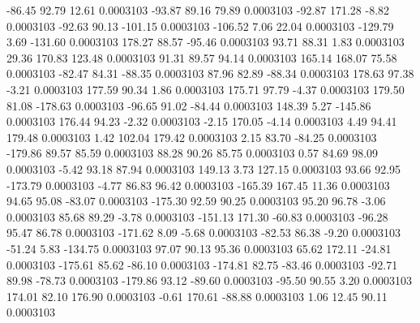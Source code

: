       -86.45       92.79       12.61     0.0003103
      -93.87       89.16       79.89     0.0003103
      -92.87      171.28       -8.82     0.0003103
      -92.63       90.13     -101.15     0.0003103
     -106.52        7.06       22.04     0.0003103
     -129.79        3.69     -131.60     0.0003103
      178.27       88.57      -95.46     0.0003103
       93.71       88.31        1.83     0.0003103
       29.36      170.83      123.48     0.0003103
       91.31       89.57       94.14     0.0003103
      165.14      168.07       75.58     0.0003103
      -82.47       84.31      -88.35     0.0003103
       87.96       82.89      -88.34     0.0003103
      178.63       97.38       -3.21     0.0003103
      177.59       90.34        1.86     0.0003103
      175.71       97.79       -4.37     0.0003103
      179.50       81.08     -178.63     0.0003103
      -96.65       91.02      -84.44     0.0003103
      148.39        5.27     -145.86     0.0003103
      176.44       94.23       -2.32     0.0003103
       -2.15      170.05       -4.14     0.0003103
        4.49       94.41      179.48     0.0003103
        1.42      102.04      179.42     0.0003103
        2.15       83.70      -84.25     0.0003103
     -179.86       89.57       85.59     0.0003103
       88.28       90.26       85.75     0.0003103
        0.57       84.69       98.09     0.0003103
       -5.42       93.18       87.94     0.0003103
      149.13        3.73      127.15     0.0003103
       93.66       92.95     -173.79     0.0003103
       -4.77       86.83       96.42     0.0003103
     -165.39      167.45       11.36     0.0003103
       94.65       95.08      -83.07     0.0003103
     -175.30       92.59       90.25     0.0003103
       95.20       96.78       -3.06     0.0003103
       85.68       89.29       -3.78     0.0003103
     -151.13      171.30      -60.83     0.0003103
      -96.28       95.47       86.78     0.0003103
     -171.62        8.09       -5.68     0.0003103
      -82.53       86.38       -9.20     0.0003103
      -51.24        5.83     -134.75     0.0003103
       97.07       90.13       95.36     0.0003103
       65.62      172.11      -24.81     0.0003103
     -175.61       85.62      -86.10     0.0003103
     -174.81       82.75      -83.46     0.0003103
      -92.71       89.98      -78.73     0.0003103
     -179.86       93.12      -89.60     0.0003103
      -95.50       90.55        3.20     0.0003103
      174.01       82.10      176.90     0.0003103
       -0.61      170.61      -88.88     0.0003103
        1.06       12.45       90.11     0.0003103

